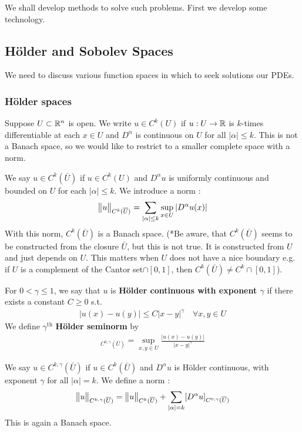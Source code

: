 \documentclass[10pt,a4paper]{report}
\begin{document}
We shall develop methods to solve such problems. First we develop some technology.

\subsection*{H\"{o}lder and Sobolev Spaces}

We need to discuss various function spaces in which to seek solutions our PDEs.

\subsubsection*{H\"{o}lder spaces}

Suppose $U\subset \mathbb{R}^n$ is open. We write $u\in C^k(U)$ if $u:U\rightarrow \mathbb{R}$ is $k$-times differentiable at each $x\in U$ and $D^{\alpha}$ is continuous on $U$ for all $|\alpha| \leq k$. This is not a Banach space, so we would like to restrict to a smaller complete space with a norm.

\quad We say $u\in C^k(\bar{U})$ if $u\in C^k (U)$ and $D^{\alpha}u$ is uniformly continuous and bounded on $U$ for each $|\alpha| \leq k$. We introduce a norm :
\begin{align*}
\bigl\lVert u\bigr\rVert_{C^k(\overline{U})} = \sum_{|\alpha|\leq k} \sup_{x\in U} |D^{\alpha}u(x)|
\end{align*}
With this norm, $C^k(\bar{U})$ is a Banach space. (*Be aware, that $C^k(\bar{U})$ seems to be constructed from the closure $\bar{U}$, but this is not true. It is constructed from $U$ and just depends on $U$. This matters when $U$ does not have a nice boundary e.g. if $U$ is a complement of the Cantor set$\cap [0,1]$, then $C^{k}(\bar{U})\neq C^{k} \cap [0,1]$).

\quad For $0< \gamma \leq 1$, we say that $u$ is \textbf{H\"{o}lder continuous with exponent $\gamma$} if there exists a constant $C\geq 0$ s.t.
\begin{align*}
|u(x)-u(y)|\leq C|x-y|^{\gamma} \quad \forall x,y \in U
\end{align*}
We define $\gamma^{\text{th}}$ \textbf{H\"{o}lder seminorm} by
\begin{align*}
[u]_{C^{0,\gamma}(\bar{U})} = \sup_{x,y\in U} \frac{|u(x)-u(y)|}{|x-y|^{\gamma}}
\end{align*}

\quad We say $u\in C^{k,\gamma}(\bar{U})$ if $u\in C^k(\bar{U})$ and $D^{\alpha}u$ is H\"{o}lder continuous, with exponent $\gamma$ for all $|\alpha|=k$. We define a norm : 
\begin{align*}
\bigl\lVert u\bigr\rVert_{C^{k,\gamma}(\overline{U})} = \bigl\lVert u\bigr\rVert_{C^k(\overline{U})} + \sum_{|\alpha|=k} [D^{\alpha} u]_{C^{0,\gamma}(\overline{U})}
\end{align*}
This is again a Banach space.
\end{document}
